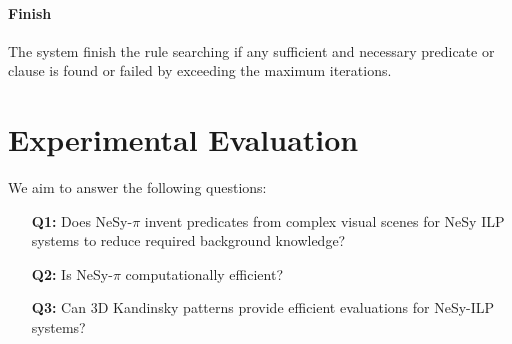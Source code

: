\documentclass[
]{ceurart}
\newcommand{\dd}[1]{\textcolor{red}{[#1 \textsc{--Dev}]}}
\newcommand{\hk}[1]{\textcolor{Apricot}{[#1 \textsc{--HK}]}}
\begin{document}
	\paragraph{Finish} 
	The system finish the rule searching if any sufficient and necessary predicate or clause is found or failed by exceeding the maximum iterations.
	
	
	
	\section{Experimental Evaluation}
	We aim to answer the following questions:
	\begin{enumerate}
		\item[\textbf{Q1:}] Does NeSy-$\pi$ invent predicates from complex visual scenes for NeSy ILP systems to reduce required background knowledge?
		\item[\textbf{Q2:}] Is NeSy-$\pi$ computationally efficient?
		\item[\textbf{Q3:}] Can 3D Kandinsky patterns provide efficient evaluations for NeSy-ILP systems?
	\end{enumerate}
	
\end{document}
